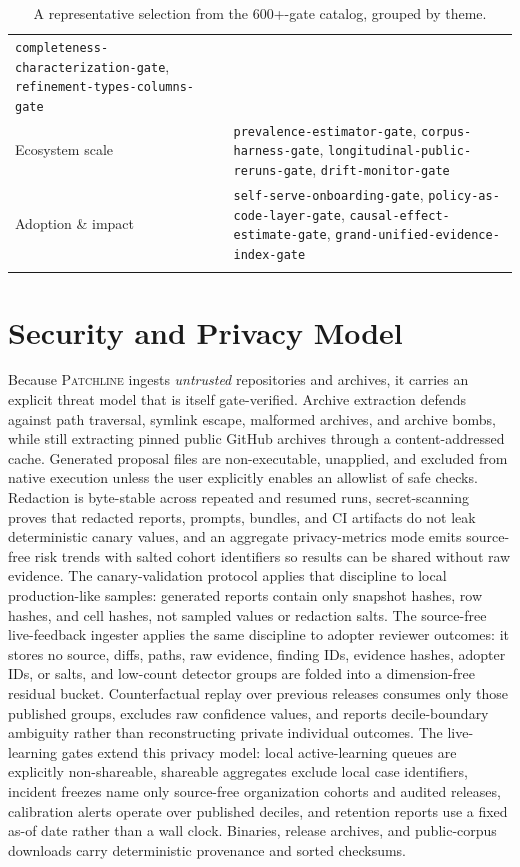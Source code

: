 \documentclass[11pt]{article}
\newcommand{\tool}{\textsc{Patchline}}
\newcommand{\code}[1]{\texttt{#1}}
\begin{document}
\begin{longtable}{>{\raggedright\arraybackslash}p{3.4cm}>{\raggedright\arraybackslash}p{10.6cm}}
\code{completeness-characterization-gate}, \code{refinement-types-columns-gate} \\
Ecosystem scale & \code{prevalence-estimator-gate}, \code{corpus-harness-gate},
\code{longitudinal-public-reruns-gate}, \code{drift-monitor-gate} \\
Adoption \& impact & \code{self-serve-onboarding-gate}, \code{policy-as-code-layer-gate},
\code{causal-effect-estimate-gate}, \code{grand-unified-evidence-index-gate} \\
\bottomrule
\caption{A representative selection from the 600+-gate catalog, grouped by theme.}
\label{tab:gatecatalog}
\end{longtable}

\section{Security and Privacy Model}
\label{app:security}

Because \tool{} ingests \emph{untrusted} repositories and archives, it carries an explicit threat
model that is itself gate-verified. Archive extraction defends against path traversal, symlink
escape, malformed archives, and archive bombs, while still extracting pinned public GitHub archives
through a content-addressed cache. Generated proposal files are non-executable, unapplied, and
excluded from native execution unless the user explicitly enables an allowlist of safe checks.
Redaction is byte-stable across repeated and resumed runs, secret-scanning proves that redacted
reports, prompts, bundles, and CI artifacts do not leak deterministic canary values, and an aggregate
privacy-metrics mode emits source-free risk trends with salted cohort identifiers so results can be
shared without raw evidence. The canary-validation protocol applies that discipline to local
production-like samples: generated reports contain only snapshot hashes, row hashes, and cell hashes,
not sampled values or redaction salts. The source-free live-feedback ingester applies the same discipline to
adopter reviewer outcomes: it stores no source, diffs, paths, raw evidence, finding IDs, evidence
hashes, adopter IDs, or salts, and low-count detector groups are folded into a dimension-free residual
bucket. Counterfactual replay over previous releases consumes only those published groups, excludes
raw confidence values, and reports decile-boundary ambiguity rather than reconstructing private
individual outcomes. The live-learning gates extend this privacy model: local active-learning queues are
explicitly non-shareable, shareable aggregates exclude local case identifiers, incident freezes name only
source-free organization cohorts and audited releases, calibration alerts operate over published deciles,
and retention reports use a fixed as-of date rather than a wall clock. Binaries, release archives, and
public-corpus downloads carry deterministic provenance and sorted checksums.
\end{document}
